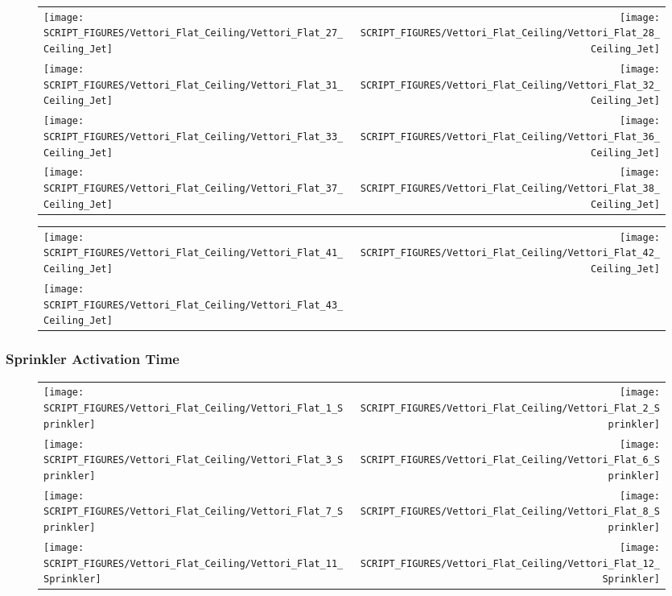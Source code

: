 \begin{figure}[p]
\begin{tabular*}{\textwidth}{l@{\extracolsep{\fill}}r}
\texttt{[image: SCRIPT\_FIGURES/Vettori\_Flat\_Ceiling/Vettori\_Flat\_27\_Ceiling\_Jet]} &
\texttt{[image: SCRIPT\_FIGURES/Vettori\_Flat\_Ceiling/Vettori\_Flat\_28\_Ceiling\_Jet]} \\
\texttt{[image: SCRIPT\_FIGURES/Vettori\_Flat\_Ceiling/Vettori\_Flat\_31\_Ceiling\_Jet]} &
\texttt{[image: SCRIPT\_FIGURES/Vettori\_Flat\_Ceiling/Vettori\_Flat\_32\_Ceiling\_Jet]} \\
\texttt{[image: SCRIPT\_FIGURES/Vettori\_Flat\_Ceiling/Vettori\_Flat\_33\_Ceiling\_Jet]} &
\texttt{[image: SCRIPT\_FIGURES/Vettori\_Flat\_Ceiling/Vettori\_Flat\_36\_Ceiling\_Jet]} \\
\texttt{[image: SCRIPT\_FIGURES/Vettori\_Flat\_Ceiling/Vettori\_Flat\_37\_Ceiling\_Jet]} &
\texttt{[image: SCRIPT\_FIGURES/Vettori\_Flat\_Ceiling/Vettori\_Flat\_38\_Ceiling\_Jet]}
\end{tabular*}
\end{figure}

\begin{figure}[p]
\begin{tabular*}{\textwidth}{l@{\extracolsep{\fill}}r}
\texttt{[image: SCRIPT\_FIGURES/Vettori\_Flat\_Ceiling/Vettori\_Flat\_41\_Ceiling\_Jet]} &
\texttt{[image: SCRIPT\_FIGURES/Vettori\_Flat\_Ceiling/Vettori\_Flat\_42\_Ceiling\_Jet]} \\
\texttt{[image: SCRIPT\_FIGURES/Vettori\_Flat\_Ceiling/Vettori\_Flat\_43\_Ceiling\_Jet]}
\end{tabular*}
\end{figure}

\clearpage

\subsubsection{Sprinkler Activation Time}

\begin{figure}[p]
\begin{tabular*}{\textwidth}{l@{\extracolsep{\fill}}r}
\texttt{[image: SCRIPT\_FIGURES/Vettori\_Flat\_Ceiling/Vettori\_Flat\_1\_Sprinkler]} &
\texttt{[image: SCRIPT\_FIGURES/Vettori\_Flat\_Ceiling/Vettori\_Flat\_2\_Sprinkler]} \\
\texttt{[image: SCRIPT\_FIGURES/Vettori\_Flat\_Ceiling/Vettori\_Flat\_3\_Sprinkler]} &
\texttt{[image: SCRIPT\_FIGURES/Vettori\_Flat\_Ceiling/Vettori\_Flat\_6\_Sprinkler]} \\
\texttt{[image: SCRIPT\_FIGURES/Vettori\_Flat\_Ceiling/Vettori\_Flat\_7\_Sprinkler]} &
\texttt{[image: SCRIPT\_FIGURES/Vettori\_Flat\_Ceiling/Vettori\_Flat\_8\_Sprinkler]} \\
\texttt{[image: SCRIPT\_FIGURES/Vettori\_Flat\_Ceiling/Vettori\_Flat\_11\_Sprinkler]} &
\texttt{[image: SCRIPT\_FIGURES/Vettori\_Flat\_Ceiling/Vettori\_Flat\_12\_Sprinkler]}
\end{tabular*}
\end{figure}

